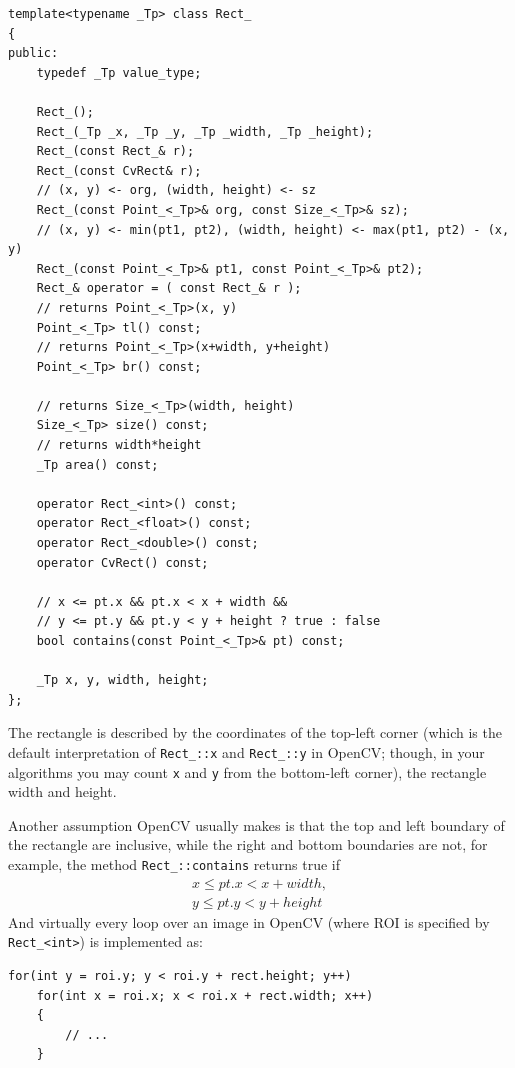 \begin{lstlisting}
template<typename _Tp> class Rect_
{
public:
    typedef _Tp value_type;
    
    Rect_();
    Rect_(_Tp _x, _Tp _y, _Tp _width, _Tp _height);
    Rect_(const Rect_& r);
    Rect_(const CvRect& r);
    // (x, y) <- org, (width, height) <- sz
    Rect_(const Point_<_Tp>& org, const Size_<_Tp>& sz);
    // (x, y) <- min(pt1, pt2), (width, height) <- max(pt1, pt2) - (x, y)
    Rect_(const Point_<_Tp>& pt1, const Point_<_Tp>& pt2);
    Rect_& operator = ( const Rect_& r );
    // returns Point_<_Tp>(x, y)
    Point_<_Tp> tl() const;
    // returns Point_<_Tp>(x+width, y+height)
    Point_<_Tp> br() const;
    
    // returns Size_<_Tp>(width, height)
    Size_<_Tp> size() const;
    // returns width*height
    _Tp area() const;

    operator Rect_<int>() const;
    operator Rect_<float>() const;
    operator Rect_<double>() const;
    operator CvRect() const;

    // x <= pt.x && pt.x < x + width &&
    // y <= pt.y && pt.y < y + height ? true : false
    bool contains(const Point_<_Tp>& pt) const;

    _Tp x, y, width, height;
};
\end{lstlisting}

The rectangle is described by the coordinates of the top-left corner (which is the default interpretation of \texttt{Rect\_::x} and \texttt{Rect\_::y} in OpenCV; though, in your algorithms you may count \texttt{x} and \texttt{y} from the bottom-left corner), the rectangle width and height.

Another assumption OpenCV usually makes is that the top and left boundary of the rectangle are inclusive, while the right and bottom boundaries are not, for example, the method \texttt{Rect\_::contains} returns true if
\begin{eqnarray*}
      x \leq pt.x < x+width,\\
      y \leq pt.y < y+height
\end{eqnarray*}
And virtually every loop over an image  in OpenCV (where ROI is specified by \texttt{Rect\_<int>}) is implemented as:
\begin{lstlisting}
for(int y = roi.y; y < roi.y + rect.height; y++)
    for(int x = roi.x; x < roi.x + rect.width; x++)
    {
        // ...
    }
\end{lstlisting}

